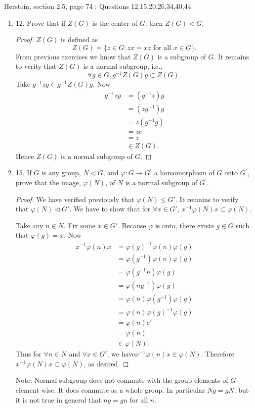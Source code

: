 
Herstein, section 2.5, page 74 : Questions 12,15,20,26,34,40,44
\begin{enumerate}
	\item 12. Prove that if $Z(G)$ is the center of $G$, then $Z(G) \triangleleft  G$. 
\begin{proof}
	$Z(G)$ is defined as \[
		Z(G) = \{z \in G: zx = xz \text{ for all }x \in G\} 
	.\] From previous exercises we know that $Z(G)$ is a subgroup of $G$. It remains to verity that $Z(G)$ is a normal subgroup, i.e., \[
		\forall g \in G, g^{-1} Z(G) g \subset Z(G)
	.\] 
	Take $g^{-1} z g \in g^{-1} Z(G) g$. Now
	\begin{align*}
		g^{-1} z g &= (g^{-1} z)g \\
		&= (z g^{-1} )g \\
		&= z(g^{-1} g) \\
		&= z e \\
		&= z \\
		&\in Z(G)
	.\end{align*}
	Hence $Z(G)$ is a normal subgroup of $G$.
\end{proof}

	\item 15. If $G$ is any group, $N \triangleleft G$, and $\varphi: G \rightarrow G^{\prime}$ a homomorphism of $G$ onto $G^{\prime}$, prove that the image, $\varphi(N)$, of $N$ is a normal subgroup of $G^{\prime}$.
\begin{proof}
	We have verified previously that $\varphi(N) \le G'$. It remains to verify that $\varphi(N) \triangleleft G'$. We have to show that for $\forall x \in G'$, $x^{-1} \varphi(N) x \subset \varphi(N)$.

	Take any $n \in N$. Fix some $x \in G'$. Because  $\varphi$ is onto, there exists $g \in G$ such that $\varphi(g) = x$. Now
	\begin{align*}
		x^{-1} \varphi(n) x &= \varphi(g)^{-1} \varphi(n) \varphi(g) \\
		&= \varphi(g^{-1} )\varphi(n)\varphi(g) \\
		&= \varphi(g^{-1} n)\varphi(g) \\
		&= \varphi(ng^{-1} )\varphi(g) \\
		&= \varphi(n)\varphi(g^{-1} )\varphi(g) \\
		&= \varphi(n)\varphi(g)^{-1}\varphi(g) \\
		&= \varphi(n) e' \\
		&= \varphi(n) \\
		&\in \varphi(N)
	.\end{align*}
Thus for $\forall  n \in N$ and  $\forall x \in G'$, we have$x^{-1} \varphi(n)x \in \varphi(N)$. Therefore $x^{-1} \varphi(N) x \subset \varphi(N)$, as desired.
\end{proof}
\begin{correction}
	Note: Normal subgroup does not commute with the group elements of $G$ element-wise. It does commute as a whole group. In particular $Ng = gN$, but it is not true in general that  $ng = gn$  for all $n$.


\end{correction}
\end{enumerate}
